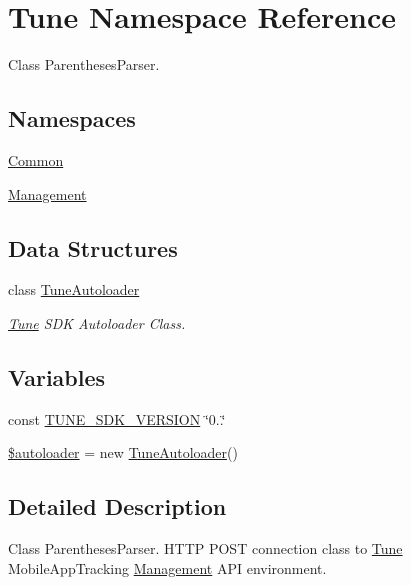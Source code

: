 \hypertarget{namespaceTune}{\section{Tune Namespace Reference}
\label{namespaceTune}
}


Class Parentheses\-Parser.  


\subsection*{Namespaces}
\begin{DoxyCompactItemize}
\item 
\hyperlink{namespaceTune_1_1Common}{Common}
\item 
\hyperlink{namespaceTune_1_1Management}{Management}
\end{DoxyCompactItemize}
\subsection*{Data Structures}
\begin{DoxyCompactItemize}
\item 
class \hyperlink{classTune_1_1TuneAutoloader}{Tune\-Autoloader}
\begin{DoxyCompactList}\small\item\em \hyperlink{namespaceTune}{Tune} S\-D\-K Autoloader Class. \end{DoxyCompactList}\end{DoxyCompactItemize}
\subsection*{Variables}
\begin{DoxyCompactItemize}
\item 
const \hyperlink{namespaceTune_a064a74b8093f320885e1a817c501a0cc}{T\-U\-N\-E\-\_\-\-S\-D\-K\-\_\-\-V\-E\-R\-S\-I\-O\-N} \char`\"{}0..\char`\"{}
\item 
\hyperlink{namespaceTune_a45833c84db9823c05fccd9d72c991286}{\$autoloader} = new \hyperlink{classTune_1_1TuneAutoloader}{Tune\-Autoloader}()
\end{DoxyCompactItemize}


\subsection{Detailed Description}
Class Parentheses\-Parser. H\-T\-T\-P P\-O\-S\-T connection class to \hyperlink{namespaceTune}{Tune} Mobile\-App\-Tracking \hyperlink{namespaceTune_1_1Management}{Management} A\-P\-I environment.

